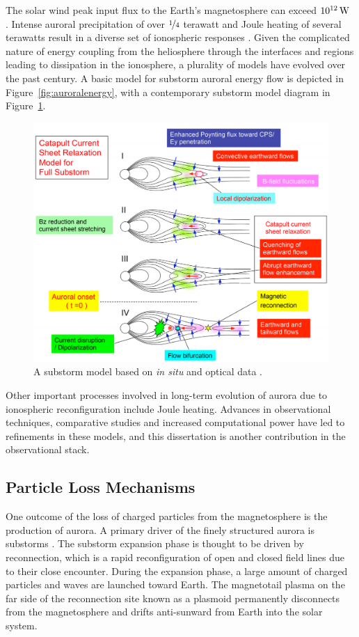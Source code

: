 The solar wind peak input flux to the Earth's magnetosphere can exceed $\unit[10^{12}]{W}$ \citep{akasofu1980}.
Intense auroral precipitation of over $\nicefrac{1}{4}$ terawatt and Joule heating of several terawatts result in a diverse set of ionospheric responses \citep{lu2016}.
Given the complicated nature of energy coupling from the heliosphere through the interfaces and regions leading to dissipation in the ionosphere, a plurality of models have evolved over the past century.
A basic model for substorm auroral energy flow is depicted in Figure~\ref{fig:auroralenergy}, with a contemporary substorm model diagram in Figure~\ref{fig:collapse}.

\begin{figure}
	\includegraphics[width=\linewidth]{gfx/substorm-catapult}
	\caption{A substorm model based on \textit{in situ} \citep{machida2009} and optical data \citep{machida2014}.}
	\label{fig:collapse}
\end{figure}
Other important processes involved in long-term evolution of aurora due to ionospheric reconfiguration include Joule heating.
Advances in observational techniques, comparative studies and increased computational power have led to refinements in these models, and this dissertation is another contribution in the observational stack.

\FloatBarrier
\subsection{Particle Loss Mechanisms}
One outcome of the loss of charged particles from the magnetosphere is the production of aurora. 
A primary driver of the finely structured aurora is substorms \citep{fukushima1962,akasofu1964,elphin1996}.
The substorm expansion phase is thought to be driven by reconnection, which is a rapid reconfiguration of open and closed field lines due to their close encounter.
During the expansion phase, a large amount of charged particles and waves are launched toward Earth.
The magnetotail plasma on the far side of the reconnection site known as a plasmoid permanently disconnects from the magnetosphere and drifts anti-sunward from Earth into the solar system. 

